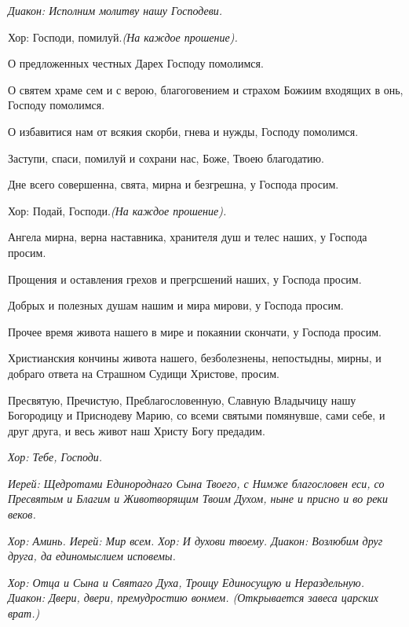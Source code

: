 

\itshape  Диакон:\normalfont{} Исполним молитву нашу Господеви. \itshape 


  Хор:\normalfont{} Господи, помилуй.\itshape  (На каждое прошение\normalfont{}). 


  О предложенных честных Дарех Господу помолимся. 


  О святем храме сем и с верою, благоговением и страхом Божиим входящих в онь, Господу помолимся. 


  О избавитися нам от всякия скорби, гнева и нужды, Господу помолимся. 


  Заступи, спаси, помилуй и сохрани нас, Боже, Твоею благодатию. 


  Дне всего совершенна, свята, мирна и безгрешна, у Господа просим. \itshape 


  Хор:\normalfont{} Подай, Господи.\itshape  (На каждое прошение)\normalfont{}. 


  Ангела мирна, верна наставника, хранителя душ и телес наших, у Господа просим. 


  Прощения и оставления грехов и прегрсшений наших, у Господа просим. 


  Добрых и полезных душам нашим и мира мирови, у Господа просим. 


  Прочее время живота нашего в мире и покаянии скончати, у Господа просим. 


  Христианския кончины живота нашего, безболезнены, непостыдны, мирны, и добраго ответа на Страшном Судищи Христове, просим. 


  Пресвятую, Пречистую, Преблагословенную, Славную Владычицу нашу Богородицу и Приснодеву Марию, со всеми святыми помянувше, сами себе, и друг друга, и весь живот наш Христу Богу предадим.


\itshape Хор:\normalfont{} Тебе, Господи.


\itshape Иерей:\normalfont{} Щедротами Единороднаго Сына Твоего, с Нимже благословен еси, со Пресвятым и Благим и Животворящим Твоим Духом, ныне и присно и во реки веков.


\itshape Хор:\normalfont{} Аминь. \itshape  Иерей:\normalfont{} Мир всем. \itshape  Хор:\normalfont{} И духови твоему. \itshape  Диакон:\normalfont{} Возлюбим друг друга, да единомыслием исповемы.


\itshape Хор:\normalfont{} Отца и Сына и Святаго Духа, Троицу Единосущую и Нераздельную. \itshape  Диакон:\normalfont{} Двери, двери, премудростию вонмем. \itshape  (Открывается завеса царских врат\normalfont{}.)

